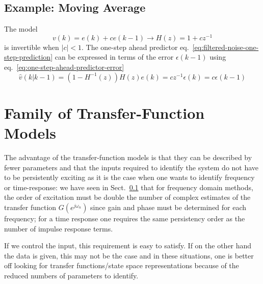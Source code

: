 \subsection{Example: Moving Average}

The model
\begin{equation*}
  v(k) = e(k) + ce(k-1) \rightarrow H(z) = 1+cz^{-1}
\end{equation*}
is invertible when $|c|<1$. The one-step ahead predictor eq.~\eqref{eq:filtered-noise-one-step-prediction} can be expressed in terms of the error $\epsilon(k-1)$ using eq.~\eqref{eq:one-step-ahead-predictor-error}
\begin{equation*}
  \hat{v}(k|k-1) = \left(1-H^{-1}(z)\right)H(z)e(k) = cz^{-1}\epsilon(k) =  c\epsilon(k-1)
\end{equation*}

\section{Family of Transfer-Function Models}
\label{sec:family-tf-models}

The advantage of the transfer-function models is that they can be described by fewer parameters and that the inputs required to identify the system do not have to be persistently exciting as it is the case when one wants to identify frequency or time-response: we have seen in Sect.~\ref{} that for frequency domain methods, the order of excitation must be double the number of complex estimates of the transfer function $G(e^{j\omega_n})$ since gain and phase must be determined for each frequency; for a time response one requires the same persistency order as the number of impulse response terms.

If we control the input, this requirement is easy to satisfy. If on the other hand the data is given, this may not be the case and in these situations, one is better off looking for transfer functions/state space representations because of the reduced numbers of parameters to identify.

